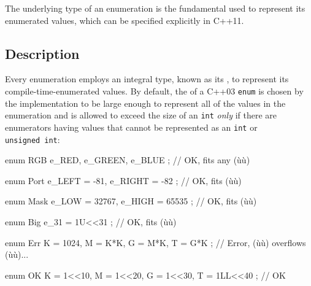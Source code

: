 


\setcounter{table}{0}
\setcounter{footnote}{0}
\setcounter{lstlisting}{0}


The underlying type of an enumeration is the fundamental
 used to represent its enumerated values, which
can be specified explicitly in C++11.

\subsection[Description]{Description}\label{description}

Every enumeration employs an integral type, known as its
, to represent its compile-time-enumerated
values. By default, the  of a C++03
\lstinline!enum! is chosen by the
implementation to be large enough to represent all of the values in the
enumeration and is allowed to exceed the size of an \lstinline!int!
\emph{only} if there are enumerators having values that cannot be
represented as an \lstinline!int! or \lstinline!unsigned!~\lstinline!int!:

\begin{emcppslisting}
enum RGB { e_RED, e_GREEN, e_BLUE };                  // OK, fits any (ù{}ù)

enum Port { e_LEFT = -81, e_RIGHT = -82 };            // OK, fits (ù{}ù)

enum Mask { e_LOW = 32767, e_HIGH = 65535 };          // OK, fits (ù{}ù)

enum Big { e_31 = 1U<<31 };                           // OK, fits (ù{}ù)

enum Err { K = 1024, M = K*K, G = M*K, T = G*K };     // Error, (ù{}ù) overflows (ù{}ù)...

enum OK { K = 1<<10, M = 1<<20, G = 1<<30, T = 1LL<<40 }; // OK
\end{emcppslisting}

